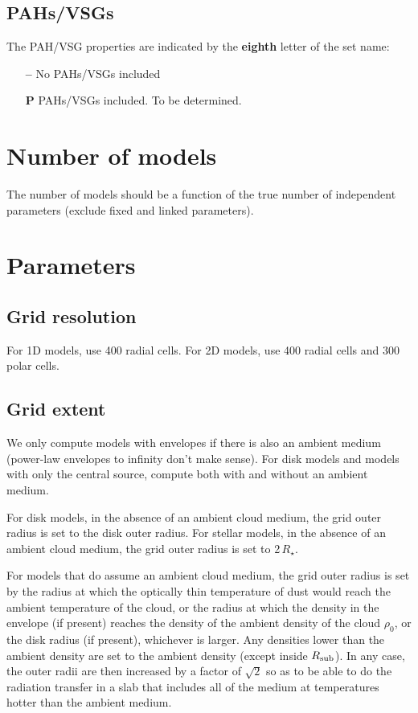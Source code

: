 \documentclass[10pt]{article}
\begin{document}
\subsection{PAHs/VSGs}

The PAH/VSG properties are indicated by the \textbf{eighth} letter of the set name:

\begin{itemize}

\item[\textbf{--}] No PAHs/VSGs included

\item[\textbf{P}] PAHs/VSGs included. To be determined.
      
\end{itemize}

\section{Number of models}

The number of models should be a function of the true number of independent parameters (exclude fixed and linked parameters).

\section{Parameters}

\subsection{Grid resolution}

For 1D models, use 400 radial cells. For 2D models, use 400 radial cells and 300 polar cells.

\subsection{Grid extent}

We only compute models with envelopes if there is also an ambient medium (power-law envelopes to infinity don't make sense). For disk models and models with only the central source, compute both with and without an ambient medium.

For disk models, in the absence of an ambient cloud medium, the grid outer radius is set to the disk outer radius. For stellar models, in the absence of an ambient cloud medium, the grid outer radius is set to 2\,$R_\star$.

For models that do assume an ambient cloud medium, the grid outer radius is set by the radius at which the optically thin temperature of dust would reach the ambient temperature of the cloud, or the radius at which the density in the envelope (if present) reaches the density of the ambient density of the cloud $\rho_0$, or the disk radius (if present), whichever is larger. Any densities lower than the ambient density are set to the ambient density (except inside $R_{\rm sub}$). In any case, the outer radii are then increased by a factor of $\sqrt{2}$ so as to be able to do the radiation transfer in a slab that includes all of the medium at temperatures hotter than the ambient medium.
\end{document}
